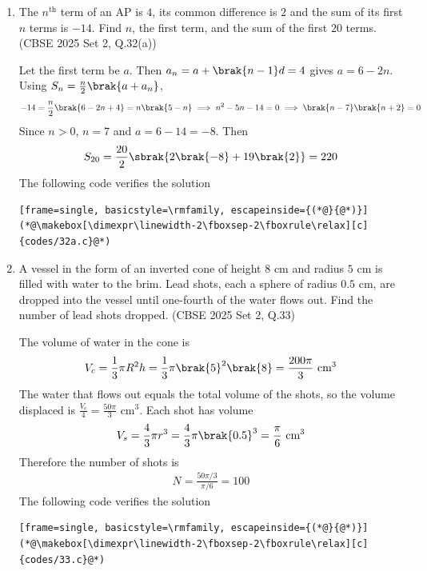 \begin{enumerate}[label=\thesubsection.\arabic*, ref=\thesubsection.\theenumi]
\item
The $n^{\text{th}}$ term of an AP is $4$, its common difference is $2$ and the sum of its first $n$ terms is $-14$. Find $n$, the first term, and the sum of the first $20$ terms.
\hfill (CBSE 2025 Set 2, Q.32(a))

\solution
Let the first term be $a$. Then $a_n = a + \brak{n-1}d = 4$ gives $a = 6 - 2n$. Using $S_n = \frac{n}{2}\brak{a + a_n}$,
\begin{align}
	-14 = \frac{n}{2}\brak{6 - 2n + 4} = n\brak{5 - n}
	\implies n^2 - 5n - 14 = 0 \implies \brak{n-7}\brak{n+2} = 0
\end{align}
Since $n > 0$, $n = 7$ and $a = 6 - 14 = -8$. Then
\begin{align}
	S_{20} = \frac{20}{2}\sbrak{2\brak{-8} + 19\brak{2}} = 220
\end{align}
The following code verifies the solution
\begin{lstlisting}[frame=single, basicstyle=\rmfamily, escapeinside={(*@}{@*)}]
(*@\makebox[\dimexpr\linewidth-2\fboxsep-2\fboxrule\relax][c]{codes/32a.c}@*)
\end{lstlisting}

\item
A vessel in the form of an inverted cone of height $8$ cm and radius $5$ cm is filled with water to the brim. Lead shots, each a sphere of radius $0.5$ cm, are dropped into the vessel until one-fourth of the water flows out. Find the number of lead shots dropped.
\hfill (CBSE 2025 Set 2, Q.33)

\solution
The volume of water in the cone is
\begin{align}
	V_c = \frac{1}{3}\pi R^2 h = \frac{1}{3}\pi\brak{5}^2\brak{8} = \frac{200\pi}{3} \text{ cm}^3
\end{align}
The water that flows out equals the total volume of the shots, so the volume displaced is $\frac{V_c}{4} = \frac{50\pi}{3}$ cm$^3$. Each shot has volume
\begin{align}
	V_s = \frac{4}{3}\pi r^3 = \frac{4}{3}\pi\brak{0.5}^3 = \frac{\pi}{6} \text{ cm}^3
\end{align}
Therefore the number of shots is
\begin{align}
	N = \frac{50\pi/3}{\pi/6} = 100
\end{align}
The following code verifies the solution
\begin{lstlisting}[frame=single, basicstyle=\rmfamily, escapeinside={(*@}{@*)}]
(*@\makebox[\dimexpr\linewidth-2\fboxsep-2\fboxrule\relax][c]{codes/33.c}@*)
\end{lstlisting}


\end{enumerate}
